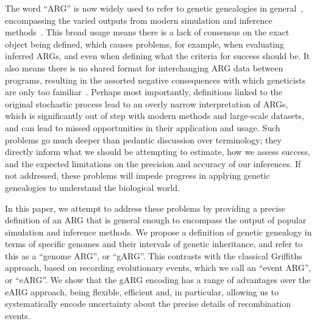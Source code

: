 \documentclass{article}
\newcommand{\tsinfer}[0]{\texttt{tsinfer}}
\begin{document}
The word ``ARG'' is now widely used to refer to genetic genealogies in
general~\citep[e.g.][]{mathieson2020ancestry,hejase2020summary,
schaefer2021ancestral,harris2023using,zhang2023biobank},
encompassing the varied outputs from modern simulation and
inference methods~\citep{rasmussen2014genome, palamara2016argon, haller2018tree,
kelleher2019inferring, speidel2019method, baumdicker2021efficient, zhang2023biobank}.
This broad usage means there is a lack of consensus on the
exact object being defined, which causes problems, for example,
when evaluating inferred ARGs, and even when defining
what the criteria for success should be.
It also means there is no shared format for interchanging ARG data between
programs, resulting in the assorted negative consequences with which
geneticists are only too familiar~\citep{excoffier2006computer,gower2022demes}.
Perhaps most importantly, definitions linked to
the original stochastic process lead to an
overly narrow interpretation of ARGs, which is significantly
out of step with modern methods and large-scale datasets, and
can lead to missed opportunities in their application and usage.
Such problems go much deeper than pedantic discussion over terminology;
they directly inform what we should be attempting to estimate, how we
assess success, and the expected limitations on the precision
and accuracy of our inferences.
If not addressed, these problems will
impede progress in applying genetic genealogies to understand the biological world.


In this paper, we attempt to address these problems by
providing a precise definition of an ARG that is general enough to encompass
the output of popular simulation and inference methods.
We propose a definition of genetic genealogy in terms of specific genomes
and their intervals of genetic inheritance, and refer to this as
a ``genome ARG'', or ``gARG''.
This contrasts with the classical Griffiths approach,
based on recording evolutionary events, which we call
an ``event ARG'', or ``eARG''.
We show that the gARG encoding has a range of advantages over the
eARG approach, being flexible, efficient and, in particular,
allowing us to systematically encode uncertainty about
the precise details of recombination events.
\end{document}
